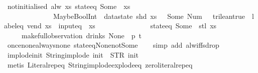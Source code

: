 \begin{isabellebody}
\endisatagproof
{\isafoldproof}%
%
\isadelimproof
\isanewline
%
\endisadelimproof
\isanewline
{}\isamarkupfalse%
\ not{\isacharunderscore}initialised{\isacharcolon}\ {\isachardoublequoteopen}alw\ {\isacharparenleft}{\isasymlambda}xs{\isachardot}\ state{\isacharunderscore}eq\ {\isacharparenleft}Some\ {}{\isacharparenright}\ xs\ {\isasymand}\isanewline
\ \ \ \ \ \ \ \ \ \ \ \ \ \ MaybeBoolInt\ {\isacharparenleft}{\isacharless}{\isacharparenright}\ {\isacharparenleft}datastate\ {\isacharparenleft}shd\ xs{\isacharparenright}\ {\isachardollar}\ {\isacharparenleft}{}{\isacharparenright}{\isacharparenright}\ {\isacharparenleft}Some\ {\isacharparenleft}Num\ {}{\isacharparenright}{\isacharparenright}\ {\isacharequal}\ trilean{\isachardot}true\ {\isasymand}\ label{\isacharunderscore}eq\ {\isacharprime}{\isacharprime}vend{\isacharprime}{\isacharprime}\ xs\ {\isasymand}\ input{\isacharunderscore}eq\ {\isacharbrackleft}{\isacharbrackright}\ xs\ {\isasymlongrightarrow}\isanewline
\ \ \ \ \ \ \ \ \ \ \ \ \ \ state{\isacharunderscore}eq\ {\isacharparenleft}Some\ {}{\isacharparenright}\ {\isacharparenleft}stl\ xs{\isacharparenright}{\isacharparenright}\isanewline
\ \ \ \ \ {\isacharparenleft}make{\isacharunderscore}full{\isacharunderscore}observation\ drinks\ None\ {\isacharless}{\isachargreater}\ p\ t{\isacharparenright}{\isachardoublequoteclose}\isanewline
%
\isadelimproof
\ \ %
\endisadelimproof
%
\isatagproof
{}\isamarkupfalse%
\ once{\isacharunderscore}none{\isacharunderscore}always{\isacharunderscore}none\ state{\isacharunderscore}eq{\isacharunderscore}None{\isacharunderscore}not{\isacharunderscore}Some\isanewline
\ \ \isamarkupfalse%
\ {\isacharparenleft}simp\ add{\isacharcolon}\ alw{\isacharunderscore}iff{\isacharunderscore}sdrop{\isacharparenright}%
\endisatagproof
{\isafoldproof}%
%
\isadelimproof
\isanewline
%
\endisadelimproof
\isanewline
{}\isamarkupfalse%
\ implode{\isacharunderscore}init{\isacharcolon}\ {\isachardoublequoteopen}String{\isachardot}implode\ {\isacharprime}{\isacharprime}init{\isacharprime}{\isacharprime}\ {\isacharequal}\ STR\ {\isacharprime}{\isacharprime}init{\isacharprime}{\isacharprime}{\isachardoublequoteclose}\isanewline
%
\isadelimproof
\ \ %
\endisadelimproof
%
\isatagproof
{}\isamarkupfalse%
\ {\isacharparenleft}metis\ Literal{\isachardot}rep{\isacharunderscore}eq\ String{\isachardot}implode{\isacharunderscore}explode{\isacharunderscore}eq\ zero{\isacharunderscore}literal{\isachardot}rep{\isacharunderscore}eq{\isacharparenright}%

\end{isabellebody}
